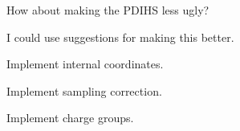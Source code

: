 \begin{DoxyRefList}
How about making the P\-D\-I\-H\-S less ugly?  
\item[\label{todo__todo000012}%
\hypertarget{todo__todo000012}{}%
Member \hyperlink{namespaceforcebalance_1_1nifty_a8d63c8ae9a67c66673a6cf81357f827d}{forcebalance\-:\-:nifty.floatornan} ]I could use suggestions for making this better.  
\item[\label{todo__todo000016}%
\hypertarget{todo__todo000016}{}%
Member \hyperlink{namespaceforcebalance_1_1parser_ac184c809737a27f35530020322431f7c}{forcebalance\-:\-:parser.parse\-\_\-inputs} ]Implement internal coordinates. 

Implement sampling correction. 

Implement charge groups. 
\end{DoxyRefList}